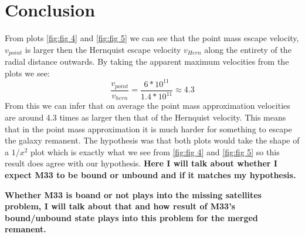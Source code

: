 \documentclass[fleqn,usenatbib]{mnras}
\begin{document}
\section{Conclusion}
From plots \ref{fig:fig 4} and \ref{fig:fig 5} we can see that the point mass escape velocity, $v_{point}$ is larger then the Hernquist escape velocity $v_{Hern}$ along the entirety of the radial distance outwards. By taking the apparent maximum velocities from the plots we see:
\begin{equation}
    \frac{v_{point}}{v_{hern}} = \frac{6*10^{11}}{1.4*10^{11}} \approx 4.3
\end{equation}
From this we can infer that on average the point mass approximation velocities are around 4.3 times as larger then that of the Hernquist velocity. This means that in the point mass approximation it is much harder for something to escape the galaxy remanent. The hypothesis was that both plots would take the shape of a $1/x^2$ plot which is exactly what we see from \ref{fig:fig 4} and \ref{fig:fig 5} so this result does agree with our hypothesis. 
\textbf{Here I will talk about whether I expect M33 to be bound or unbound and if it matches my hypothesis.}

\textbf{Whether M33 is boand or not plays into the missing satellites problem, I will talk about that and how result of M33's bound/unbound state plays into this problem for the merged remanent.}











\bsp	%
\label{lastpage}
\end{document}
